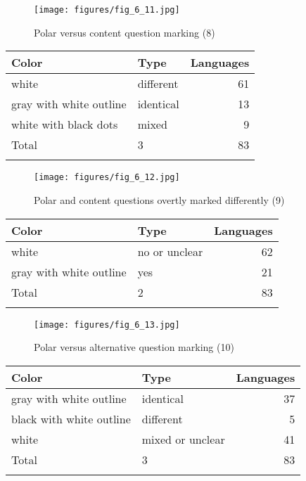 \clearpage %
\begin{figure}
\texttt{[image: figures/fig\_6\_11.jpg]}
\caption{Polar versus content question marking (8)}
\label{fig:6:11}
\end{figure}

\begin{table}
\begin{tabularx}{\textwidth}{lQr}
\lsptoprule

\textbf{Color} & \textbf{Type} & \textbf{Languages}\\
\midrule
white & different & 61\\
gray with white outline & identical & 13\\
white with black dots & mixed & 9\\
\midrule Total & 3 & 83\\
\lspbottomrule
\end{tabularx}
\end{table}

\clearpage %
\begin{figure}
\texttt{[image: figures/fig\_6\_12.jpg]}
\caption{Polar and content questions overtly marked differently (9)}
\label{fig:6:12}
\end{figure}

\begin{table}
\begin{tabularx}{\textwidth}{lQr}
\lsptoprule

\textbf{Color} & \textbf{Type} & \textbf{Languages}\\
\midrule
white & no or unclear & 62\\
gray with white outline & yes & 21\\
\midrule Total & 2 & 83\\
\lspbottomrule
\end{tabularx}
\end{table}

\clearpage %
\begin{figure}
\texttt{[image: figures/fig\_6\_13.jpg]}
\caption{Polar versus alternative question marking (10)}
\label{fig:6:13}
\end{figure}

\begin{table}
\begin{tabularx}{\textwidth}{lQr}
\lsptoprule

\textbf{Color} &   \textbf{Type} & \textbf{Languages}\\
\midrule
gray with white outline & identical & 37\\
black with white outline & different & 5\\
white & mixed or unclear & 41\\
\midrule Total & 3 & 83\\
\lspbottomrule
\end{tabularx}
\end{table}

